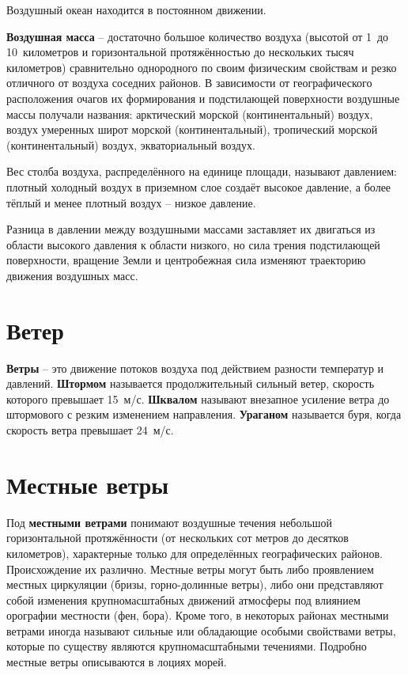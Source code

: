 \documentclass[a4paper, 12pt, twoside, final, book, russian, fittopage, cyremdash, openright]{ncc}
\newcommand{\mps}{~м/с\xspace}
\begin{document}
Воздушный океан находится в постоянном движении.

\textbf{Воздушная масса} \--- достаточно
большое количество воздуха (высотой от 1~до 10~километров и
горизонтальной протяжённостью до нескольких тысяч километров)
сравнительно однородного по своим физическим свойствам и резко
отличного от воздуха соседних районов. В зависимости от
географического расположения очагов их формирования и подстилающей
поверхности воздушные массы получали названия: арктический морской
(континентальный) воздух, воздух умеренных широт морской
(континентальный), тропический морской (континентальный) воздух,
экваториальный воздух.

Вес столба воздуха, распределённого на единице площади, называют
давлением: плотный холодный воздух в приземном слое
создаёт высокое давление, а более тёплый и менее плотный воздух \---
низкое давление.

Разница в давлении между воздушными массами заставляет их двигаться из
области высокого давления к области низкого, но сила трения
подстилающей поверхности, вращение Земли и центробежная сила изменяют
траекторию движения воздушных масс.

\section{Ветер}
\label{sec:wind}

\textbf{Ветры} \--- это движение потоков воздуха под
действием разности температур и
давлений. \textbf{Штормом} называется продолжительный
сильный ветер, скорость которого превышает 15\mps{}.
\textbf{Шквалом} называют внезапное усиление ветра до
штормового с резким изменением направления.
\textbf{Ураганом} называется буря, когда скорость ветра
превышает 24\mps{}.

\section{Местные ветры}
\label{sec:local_winds}

Под \textbf{местными ветрами} понимают воздушные течения небольшой
горизонтальной протяжённости (от нескольких сот метров до десятков
километров), характерные только для определённых географических
районов. Происхождение их различно. Местные ветры могут быть либо
проявлением местных циркуляции (бризы, горно-долинные
ветры), либо они представляют собой
изменения крупномасштабных движений атмосферы под влиянием орографии
местности (фен, бора). Кроме того, в некоторых
районах местными ветрами иногда называют сильные или обладающие
особыми свойствами ветры, которые по существу являются
крупномасштабными течениями. Подробно местные ветры описываются в
лоциях морей.
\end{document}

